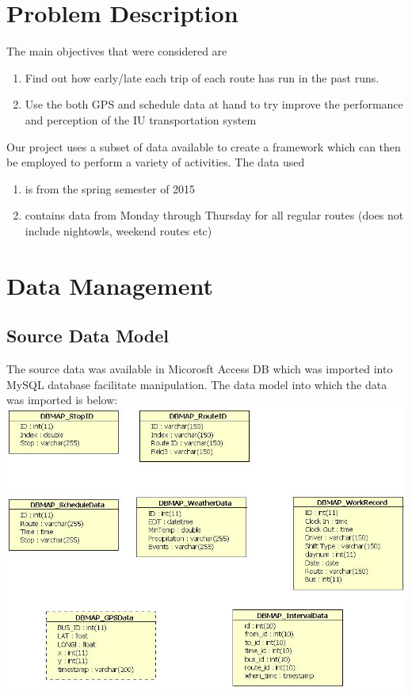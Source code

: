 \documentclass[12pt]{article}\usepackage[]{graphicx}\usepackage[]{color}
\begin{document}
\section{Problem Description}
The main objectives that were considered are
\begin{enumerate}
\item Find out how early/late each trip of each route has run in the past runs. 
\item Use the both GPS and schedule data at hand to try improve the performance and perception of the IU transportation system
\end{enumerate}
Our project uses a subset of data available to create a framework which can then be employed to perform a variety of activities. The data used
\begin{enumerate}
\item is from the spring semester of 2015
\item contains data from Monday through Thursday for all regular routes (does not include nightowls, weekend routes etc)
\end{enumerate}

\section{Data Management}
\subsection{Source Data Model}
The source data was available in Micorosft Access DB which was imported into MySQL database facilitate manipulation. The data model into which the data was imported is below:\\
\includegraphics[scale=0.5]{resources/dbmap_access}\\[1cm] 
\end{document}
